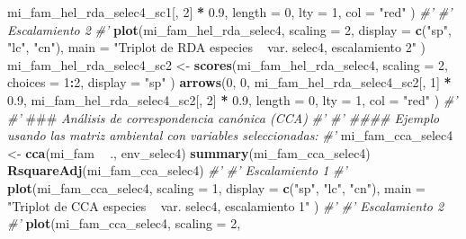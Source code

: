 \documentclass[11pt,]{article}
\newenvironment{Shaded}{\begin{snugshade}}{\end{snugshade}}
\newcommand{\KeywordTok}[1]{\textcolor[rgb]{0.13,0.29,0.53}{\textbf{#1}}}
\newcommand{\DataTypeTok}[1]{\textcolor[rgb]{0.13,0.29,0.53}{#1}}
\newcommand{\DecValTok}[1]{\textcolor[rgb]{0.00,0.00,0.81}{#1}}
\newcommand{\FloatTok}[1]{\textcolor[rgb]{0.00,0.00,0.81}{#1}}
\newcommand{\StringTok}[1]{\textcolor[rgb]{0.31,0.60,0.02}{#1}}
\newcommand{\CommentTok}[1]{\textcolor[rgb]{0.56,0.35,0.01}{\textit{#1}}}
\newcommand{\OperatorTok}[1]{\textcolor[rgb]{0.81,0.36,0.00}{\textbf{#1}}}
\newcommand{\AlertTok}[1]{\textcolor[rgb]{0.94,0.16,0.16}{#1}}
\newcommand{\NormalTok}[1]{#1}
\begin{document}
\begin{Shaded}
\begin{Highlighting}[]
{{{{{{{{{{{{{\NormalTok{       mi_fam_hel_rda_selec4_sc1[, }\DecValTok{2}\NormalTok{] }\OperatorTok{*}\StringTok{ }\FloatTok{0.9}\NormalTok{,}
       \DataTypeTok{length =} \DecValTok{0}\NormalTok{,}
       \DataTypeTok{lty =} \DecValTok{1}\NormalTok{,}
       \DataTypeTok{col =} \StringTok{"red"}
\NormalTok{)}
\CommentTok{#' }
\CommentTok{#' Escalamiento 2}
\CommentTok{#' }
\KeywordTok{plot}\NormalTok{(mi_fam_hel_rda_selec4,}
     \DataTypeTok{scaling =} \DecValTok{2}\NormalTok{,}
     \DataTypeTok{display =} \KeywordTok{c}\NormalTok{(}\StringTok{"sp"}\NormalTok{, }\StringTok{"lc"}\NormalTok{, }\StringTok{"cn"}\NormalTok{),}
     \DataTypeTok{main =} \StringTok{"Triplot de RDA especies ~ var. selec4, escalamiento 2"}
\NormalTok{)}
\NormalTok{mi_fam_hel_rda_selec4_sc2 <-}
\StringTok{  }\KeywordTok{scores}\NormalTok{(mi_fam_hel_rda_selec4,}
         \DataTypeTok{scaling =} \DecValTok{2}\NormalTok{,}
         \DataTypeTok{choices =} \DecValTok{1}\OperatorTok{:}\DecValTok{2}\NormalTok{,}
         \DataTypeTok{display =} \StringTok{"sp"}
\NormalTok{  )}
\KeywordTok{arrows}\NormalTok{(}\DecValTok{0}\NormalTok{, }\DecValTok{0}\NormalTok{,}
\NormalTok{       mi_fam_hel_rda_selec4_sc2[, }\DecValTok{1}\NormalTok{] }\OperatorTok{*}\StringTok{ }\FloatTok{0.9}\NormalTok{,}
\NormalTok{       mi_fam_hel_rda_selec4_sc2[, }\DecValTok{2}\NormalTok{] }\OperatorTok{*}\StringTok{ }\FloatTok{0.9}\NormalTok{,}
       \DataTypeTok{length =} \DecValTok{0}\NormalTok{,}
       \DataTypeTok{lty =} \DecValTok{1}\NormalTok{,}
       \DataTypeTok{col =} \StringTok{"red"}
\NormalTok{)}
\CommentTok{#' }
\CommentTok{#' }\AlertTok{###}\CommentTok{ Análisis de correspondencia canónica (CCA)}
\CommentTok{#' }
\CommentTok{#' #### Ejemplo usando las matriz ambiental con variables seleccionadas:}
\CommentTok{#' }
\NormalTok{mi_fam_cca_selec4 <-}\StringTok{ }\KeywordTok{cca}\NormalTok{(mi_fam }\OperatorTok{~}\StringTok{ }\NormalTok{., env_selec4)}
\KeywordTok{summary}\NormalTok{(mi_fam_cca_selec4)}
\KeywordTok{RsquareAdj}\NormalTok{(mi_fam_cca_selec4)}
\CommentTok{#' }
\CommentTok{#' Escalamiento 1}
\CommentTok{#' }
\KeywordTok{plot}\NormalTok{(mi_fam_cca_selec4,}
     \DataTypeTok{scaling =} \DecValTok{1}\NormalTok{,}
     \DataTypeTok{display =} \KeywordTok{c}\NormalTok{(}\StringTok{"sp"}\NormalTok{, }\StringTok{"lc"}\NormalTok{, }\StringTok{"cn"}\NormalTok{),}
     \DataTypeTok{main =} \StringTok{"Triplot de CCA especies ~ var. selec4, escalamiento 1"}
\NormalTok{)}
\CommentTok{#' }
\CommentTok{#' Escalamiento 2}
\CommentTok{#' }
\KeywordTok{plot}\NormalTok{(mi_fam_cca_selec4,}
     \DataTypeTok{scaling =} \DecValTok{2}\NormalTok{,}
}}}}}}}}}}}}}
\end{Highlighting}
\end{Shaded}
\end{document}
